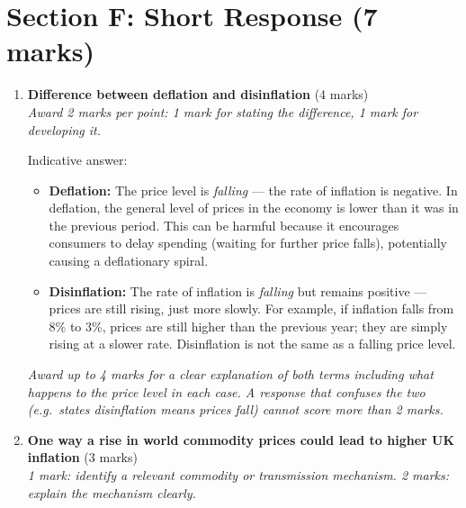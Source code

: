 \documentclass[12pt,a4paper]{article}
\begin{document}
\newpage

\section*{Section F: Short Response (7 marks)}

\begin{enumerate}[leftmargin=*, label=\textbf{\arabic*.}]

    \item \textbf{Difference between deflation and disinflation} \hfill (4 marks)\\
    \textit{Award 2 marks per point: 1 mark for stating the difference, 1 mark for developing it.}

    \vspace{0.3em}
    Indicative answer:
    \begin{itemize}
        \item \textbf{Deflation:} The price level is \textit{falling} --- the rate of inflation is negative. In deflation, the general level of prices in the economy is lower than it was in the previous period. This can be harmful because it encourages consumers to delay spending (waiting for further price falls), potentially causing a deflationary spiral.
        \item \textbf{Disinflation:} The rate of inflation is \textit{falling} but remains positive --- prices are still rising, just more slowly. For example, if inflation falls from 8\% to 3\%, prices are still higher than the previous year; they are simply rising at a slower rate. Disinflation is not the same as a falling price level.
    \end{itemize}
    \textit{Award up to 4 marks for a clear explanation of both terms including what happens to the price level in each case. A response that confuses the two (e.g.\ states disinflation means prices fall) cannot score more than 2 marks.}

    \vspace{0.5em}

    \item \textbf{One way a rise in world commodity prices could lead to higher UK inflation} \hfill (3 marks)\\
    \textit{1 mark: identify a relevant commodity or transmission mechanism. 2 marks: explain the mechanism clearly.}


\end{enumerate}
\end{document}
